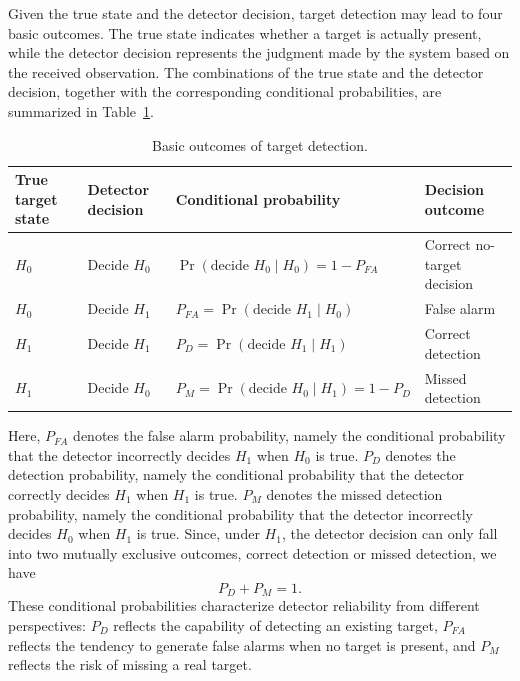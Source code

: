 Given the true state and the detector decision, target detection may lead to
four basic outcomes.
The true state indicates whether a target is actually present, while the
detector decision represents the judgment made by the system based on the
received observation.
The combinations of the true state and the detector decision, together with
the corresponding conditional probabilities, are summarized in
Table~\ref{tab:detection_outcomes}.

\begin{table}[htbp]
    \centering
    \caption{Basic outcomes of target detection.}
    \label{tab:detection_outcomes}
    \small
    \renewcommand{\arraystretch}{1.25}
    \begin{tabularx}{\textwidth}{
        >{\centering\arraybackslash}p{}
        >{\centering\arraybackslash}p{}
        >{\centering\arraybackslash}p{}
        >{\raggedright\arraybackslash}X
    }
        \toprule
        True target state
        & Detector decision
        & Conditional probability
        & Decision outcome \\
        \midrule

        \(H_0\)
        & Decide \(H_0\)
        & \(\Pr(\text{decide }H_0 \mid H_0)=1-P_{FA}\)
        & Correct no-target decision \\

        \(H_0\)
        & Decide \(H_1\)
        & \(P_{FA}=\Pr(\text{decide }H_1 \mid H_0)\)
        & False alarm \\

        \(H_1\)
        & Decide \(H_1\)
        & \(P_D=\Pr(\text{decide }H_1 \mid H_1)\)
        & Correct detection \\

        \(H_1\)
        & Decide \(H_0\)
        & \(P_M=\Pr(\text{decide }H_0 \mid H_1)=1-P_D\)
        & Missed detection \\
        \bottomrule
    \end{tabularx}
\end{table}

Here, \(P_{FA}\) denotes the false alarm probability, namely the conditional
probability that the detector incorrectly decides \(H_1\) when \(H_0\) is true.
\(P_D\) denotes the detection probability, namely the conditional probability
that the detector correctly decides \(H_1\) when \(H_1\) is true.
\(P_M\) denotes the missed detection probability, namely the conditional
probability that the detector incorrectly decides \(H_0\) when \(H_1\) is true.
Since, under \(H_1\), the detector decision can only fall into two mutually
exclusive outcomes, correct detection or missed detection, we have
\begin{equation}
    P_D+P_M=1.
    \label{eq:detection_missed_relation}
\end{equation}
These conditional probabilities characterize detector reliability from
different perspectives:
\(P_D\) reflects the capability of detecting an existing target,
\(P_{FA}\) reflects the tendency to generate false alarms when no target is
present, and \(P_M\) reflects the risk of missing a real target.

